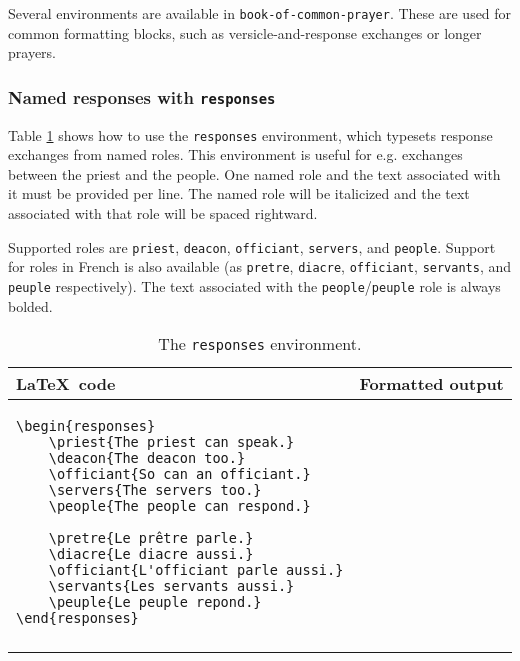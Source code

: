 \documentclass{article}
\begin{document}
Several environments are available in \texttt{book-of-common-prayer}. These are used for common formatting blocks, such as versicle-and-response exchanges or longer prayers.

\subsubsection{Named responses with \lstinline{responses}}

Table \ref{tab:env_responses} shows how to use the \lstinline{responses} environment, which typesets response exchanges from named roles. This environment is useful for e.g. exchanges between the priest and the people. One named role and the text associated with it must be provided per line. The named role will be italicized and the text associated with that role will be spaced rightward.

Supported roles are \lstinline{priest}, \lstinline{deacon}, \lstinline{officiant}, \lstinline{servers}, and \lstinline{people}. Support for roles in French is also available (as \lstinline{pretre}, \lstinline{diacre}, \lstinline{officiant}, \lstinline{servants}, and \lstinline{peuple} respectively). The text associated with the \lstinline{people}/\lstinline{peuple} role is always bolded.

\pagebreak
\begin{table}[h]
\centering
\begin{tabular}{ll}
\toprule
\LaTeX\ code & Formatted output \\
\midrule
\begin{lstlisting}
\begin{responses}
	\priest{The priest can speak.}
	\deacon{The deacon too.}
	\officiant{So can an officiant.}
	\servers{The servers too.}
	\people{The people can respond.}

	\pretre{Le prêtre parle.}
	\diacre{Le diacre aussi.}
	\officiant{L'officiant parle aussi.}
	\servants{Les servants aussi.}
	\peuple{Le peuple repond.}
\end{responses}
\end{lstlisting}
&
\sabon{ 
\begin{responsesex}
	\priest{The priest can speak.}
	\deacon{The deacon too.}
	\officiant{So can an officiant.}
	\servers{The servers too.}
	\people{The people can respond.}
	& \\
	\pretre{Le prêtre parle.}
	\diacre{Le diacre aussi.}
	\officiant{L'officiant parle aussi.}
	\servants{Les servants aussi.}
	\peuple{Le peuple repond.}
\end{responsesex}
}
\\
\bottomrule
\end{tabular}
\caption{The \lstinline{responses} environment.}
\label{tab:env_responses}
\end{table}
\end{document}
